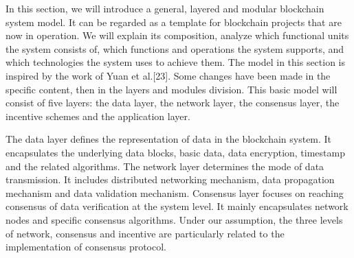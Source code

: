 \documentclass[doublespacing]{bmcart}
\begin{document}
\begin{CJK*}{UTF8}{gbsn}
	

In this section, we will introduce a general, layered and modular blockchain system model. It can be regarded as a template for blockchain projects that are now in operation. We will explain its composition, analyze which functional units the system consists of, which functions and operations the system supports, and which technologies the system uses to achieve them.
 The model in this section is inspired by the work of Yuan et al.[23]. Some changes have been made in the specific content, then in the layers and modules division. This basic model will consist of five layers: the data layer, the network layer, the consensus layer, the incentive schemes and the application layer.

 The data layer defines the representation of data in the blockchain system. It encapsulates the underlying data blocks, basic data, data encryption, timestamp and the related algorithms.
 The network layer determines the mode of data transmission. It includes distributed networking mechanism, data propagation mechanism and data validation mechanism.
 Consensus layer focuses on reaching consensus of data verification at the system level. It mainly encapsulates network nodes and specific consensus algorithms. Under our assumption, the three levels of network, consensus and incentive are particularly related to the implementation of consensus protocol.	

 

\end{CJK*}
\end{document}
